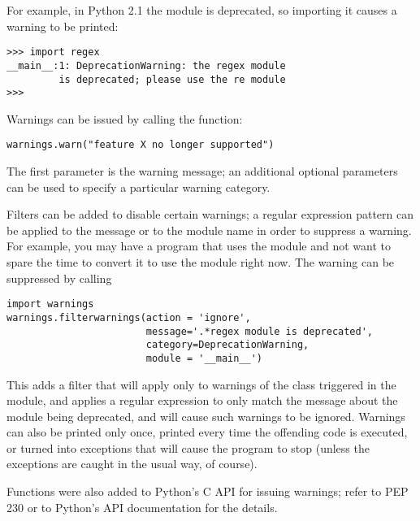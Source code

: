 \documentclass{howto}
\begin{document}
For example, in Python 2.1 the  module is deprecated, so
importing it causes a warning to be printed:

\begin{verbatim}
>>> import regex
__main__:1: DeprecationWarning: the regex module
         is deprecated; please use the re module
>>>
\end{verbatim}

Warnings can be issued by calling the 
function:

\begin{verbatim}
warnings.warn("feature X no longer supported")
\end{verbatim}

The first parameter is the warning message; an additional optional
parameters can be used to specify a particular warning category.

Filters can be added to disable certain warnings; a regular expression
pattern can be applied to the message or to the module name in order
to suppress a warning.  For example, you may have a program that uses
the  module and not want to spare the time to convert it
to use the  module right now.  The warning can be
suppressed by calling

\begin{verbatim}
import warnings
warnings.filterwarnings(action = 'ignore',
                        message='.*regex module is deprecated',
                        category=DeprecationWarning,
                        module = '__main__')
\end{verbatim}

This adds a filter that will apply only to warnings of the class
 triggered in the  module,
and applies a regular expression to only match the message about the
 module being deprecated, and will cause such warnings
to be ignored.  Warnings can also be printed only once, printed every
time the offending code is executed, or turned into exceptions that
will cause the program to stop (unless the exceptions are caught in
the usual way, of course).

Functions were also added to Python's C API for issuing warnings;
refer to PEP 230 or to Python's API documentation for the details.

\begin{seealso} 



\end{seealso}
    
\end{document}
